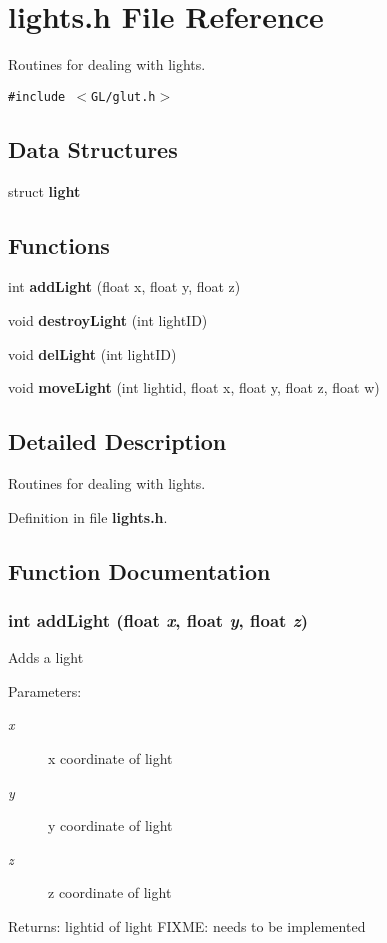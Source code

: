 \section{lights.h File Reference}
\label{lights_8h}
Routines for dealing with lights.  


{\tt \#include $<$GL/glut.h$>$}\par
\subsection*{Data Structures}
\begin{CompactItemize}
\item 
struct {\bf light}
\end{CompactItemize}
\subsection*{Functions}
\begin{CompactItemize}
\item 
int {\bf add\-Light} (float x, float y, float z)
\item 
void {\bf destroy\-Light} (int light\-ID)
\item 
void {\bf del\-Light} (int light\-ID)
\item 
void {\bf move\-Light} (int lightid, float x, float y, float z, float w)
\end{CompactItemize}


\subsection{Detailed Description}
Routines for dealing with lights. 



Definition in file {\bf lights.h}.

\subsection{Function Documentation}
\subsubsection{\setlength{\rightskip}{0pt plus 5cm}int add\-Light (float {\em x}, float {\em y}, float {\em z})}\label{lights_8h_a0}


Adds a light

\begin{Desc}
\item[Parameters:]
\begin{description}
\item[{\em x}]x coordinate of light \item[{\em y}]y coordinate of light \item[{\em z}]z coordinate of light \end{description}
\end{Desc}
\begin{Desc}
\item[Returns:]lightid of light FIXME: needs to be implemented \end{Desc}


